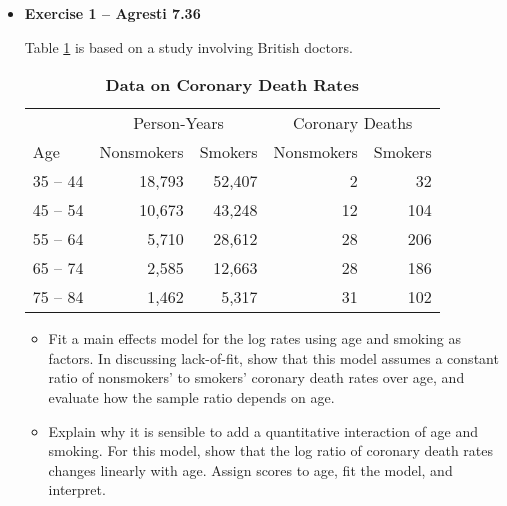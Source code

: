 \documentclass[]{article}
\title{}
\author{}
\date{}
\begin{document}
\begin{itemize}

\item[1.] {\bf Exercise 1 -- Agresti 7.36}

Table \ref{table:exo1} is based on a study involving British doctors.

\begin{table}[h]
\begin{center}
\begin{tabular}{lrrrr}
 & \multicolumn{2}{c}{Person-Years}  &  \multicolumn{2}{c}{Coronary Deaths} \\ 
 Age & Nonsmokers & Smokers & Nonsmokers & Smokers \\ \hline
35 -- 44 & 18,793 & 52,407 & 2 & 32 \\
45 -- 54 & 10,673 & 43,248 & 12 & 104 \\
55 -- 64 & 5,710 & 28,612 & 28 & 206 \\
65 -- 74 & 2,585 & 12,663 & 28 & 186 \\
75 -- 84 & 1,462 & 5,317 & 31 & 102 \\ \hline
\end{tabular}
\caption{\bf Data on Coronary Death Rates} \label{table:exo1}
\end{center}
\end{table}

\begin{itemize}
\item[(a)] Fit a main effects model for the log rates using age and smoking as factors. In discussing lack-of-fit, show that this model assumes a constant ratio of nonsmokers' to smokers' coronary death rates over age, and evaluate how the sample ratio depends on age.

\vspace{3 in}

\item[(b)] Explain why it is sensible to add a quantitative interaction of age and smoking. For this model, show that the log ratio of coronary death rates changes linearly with age. Assign scores to age, fit the model, and interpret.
\end{itemize}
\end{itemize}

\newpage
\end{document}
